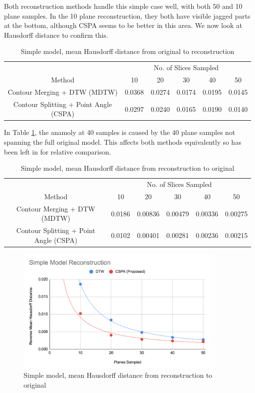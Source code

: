 \documentclass[11p, titlepage]{article}
\begin{document}
Both reconstruction methods handle this simple case well, with both 50 and 10 plane samples. In the 10 plane reconstruction, they both have visible jagged parts at the bottom, although CSPA seems to be better in this area. We now look at Hausdorff distance to confirm this.

\begin{table}[h]
\begin{tabular}{ | c | c | c | c | c | c | }
\hline
& \multicolumn{5}{c|}{No. of Slices Sampled} \\
\cline{2-6}
Method & 10 & 20 & 30 & 40 & 50 \\
\hline
Contour Merging + DTW (MDTW) & 0.0368 & 0.0274 & 0.0174 & 0.0195 & 0.0145 \\
Contour Splitting + Point Angle (CSPA) & 0.0297 & 0.0240 & 0.0165 & 0.0190 & 0.0140 \\
\hline
\end{tabular}
\caption{Simple model, mean Hausdorff distance from original to reconstruction}
\label{table:simple_forward}
\end{table}

In Table \ref{table:simple_forward}, the anamoly at 40 samples is caused by the 40 plane samples not spanning the full original model. This affects both methods equivalently so has been left in for relative comparison.

\begin{table}[h]
\begin{tabular}{ | c | c | c | c | c | c | }
\hline
& \multicolumn{5}{c|}{No. of Slices Sampled} \\
\cline{2-6}
Method & 10 & 20 & 30 & 40 & 50 \\
\hline
Contour Merging + DTW (MDTW) & 0.0186 & 0.00836 & 0.00479 & 0.00336 & 0.00275 \\
Contour Splitting + Point Angle (CSPA) & 0.0102 & 0.00401 & 0.00281 & 0.00236 & 0.00215 \\
\hline
\end{tabular}
\caption{Simple model, mean Hausdorff distance from reconstruction to original}
\label{table:simple_reverse}
\end{table}

\begin{figure}[h]
\centering
\includegraphics[width=0.9\textwidth]{graphs/simple-reverse}
\caption{Simple model, mean Hausdorff distance from reconstruction to original\label{fig:simple_reverse_graph}}
\end{figure}
\end{document}

